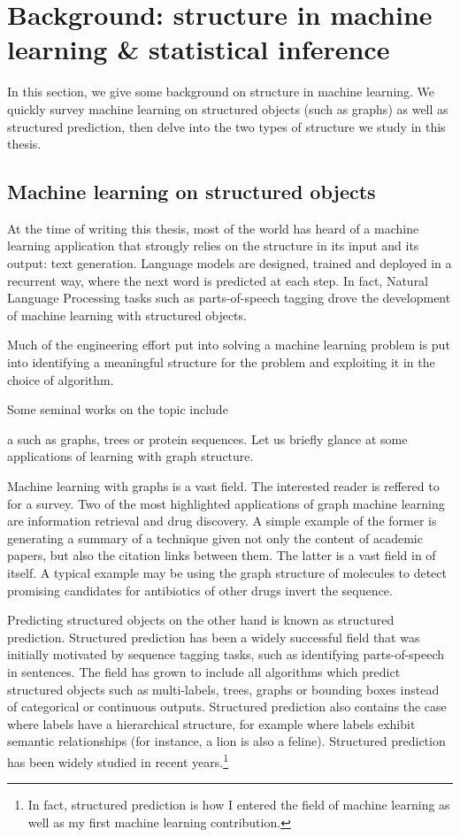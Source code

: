 \section{Background: structure in machine learning \& statistical inference}

In this section, we give some background on structure in machine learning. We quickly survey machine learning on structured objects (such as graphs) as well as structured prediction, then delve into the two types of structure we study in this thesis.

\subsection{Machine learning on structured objects}

At the time of writing this thesis, most of the world has heard of a machine learning application that strongly relies on the structure in its input and its output: text generation. Language models are designed, trained and deployed in a recurrent way, where the next word is predicted at each step. In fact, Natural Language Processing tasks such as parts-of-speech tagging drove the development of machine learning with structured objects.

Much of the engineering effort put into solving a machine learning problem is put into identifying a meaningful structure for the problem and exploiting it in the choice of algorithm.

Some seminal works on the topic include \cite{advancedStructuredPrediction2014MIT,bakir2007predicting}

a such as graphs, trees or protein sequences. Let us briefly glance at some applications of learning with graph structure.

Machine learning with graphs is a vast field. The interested reader is reffered to \cite{FengXiaGraphSurvey} for a survey. Two of the most highlighted applications of graph machine learning are information retrieval and drug discovery. A simple example of the former is generating a summary of a technique given not only the content of academic papers, but also the citation links between them. The latter is a vast field in of itself. A typical example may be using the graph structure of molecules to detect promising candidates for antibiotics of other drugs invert the sequence\cite{stokes-antibiotics}.

Predicting structured objects on the other hand is known as structured prediction. Structured prediction has been a widely successful field that was initially motivated by sequence tagging tasks, such as identifying parts-of-speech in sentences. The field has grown to include all algorithms which predict structured objects such as multi-labels, trees, graphs or bounding boxes instead of categorical or continuous outputs. Structured prediction also contains the case where labels have a hierarchical structure, for example where labels exhibit semantic relationships (for instance, a lion is also a feline). Structured prediction has been widely studied in recent years\cite{rudi-structured,nowak-vila}.\footnote{In fact, structured prediction is how I entered the field of machine learning as well as my first machine learning contribution.}

